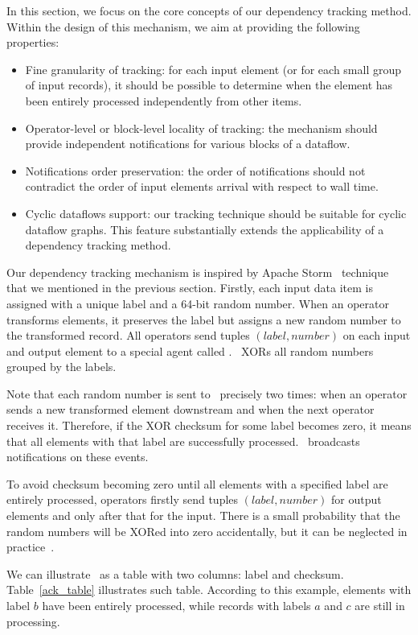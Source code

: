 \label{fs-acker-design}

In this section, we focus on the core concepts of our dependency tracking method. Within the design of this mechanism, we aim at providing the following properties:
\begin{itemize}
    \item Fine granularity of tracking: for each input element (or for each small group of input records), it should be possible to determine when the element has been entirely processed independently from other items.
    \item Operator-level or block-level locality of tracking: the mechanism should provide independent notifications for various blocks of a dataflow.
    \item Notifications order preservation: the order of notifications should not contradict the order of input elements arrival with respect to wall time.
    \item Cyclic dataflows support: our tracking technique should be suitable for cyclic dataflow graphs. This feature substantially extends the applicability of a dependency tracking method.
\end{itemize}

Our dependency tracking mechanism is inspired by Apache Storm \acker\ technique that we mentioned in the previous section. Firstly, each input data item is assigned with a unique label and a 64-bit random number. When an operator transforms elements, it preserves the label but assigns a new random number to the transformed record. All operators send tuples $(label, number)$ on each input and output element to a special agent called \acker . \acker\ XORs all random numbers grouped by the labels. 

Note that each random number is sent to \acker\ precisely two times: when an operator sends a new transformed element downstream and when the next operator receives it. Therefore, if the XOR checksum for some label becomes zero, it means that all elements with that label are successfully processed. \acker\ broadcasts notifications on these events.

To avoid checksum becoming zero until all elements with a specified label are entirely processed, operators firstly send tuples $(label, number)$ for output elements and only after that for the input. There is a small probability that the random numbers will be XORed into zero accidentally, but it can be neglected in practice~\cite{apache:storm:acker}.

We can illustrate \acker\ as a table with two columns: label and checksum. Table~\ref{ack_table} illustrates such table. According to this example, elements with label $b$ have been entirely processed, while records with labels $a$ and $c$ are still in processing.

